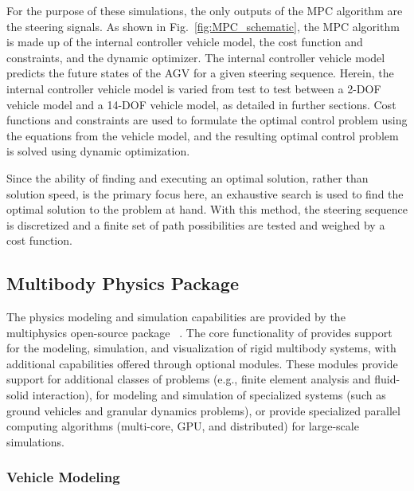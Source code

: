\documentclass[12pt,twocolumn]{article}
\newcommand{\CHRONO}{{\sffamily{{Chrono}}}}
\begin{document}
For the purpose of these simulations, the only outputs of the MPC algorithm are the steering signals. As shown in Fig.~\ref{fig:MPC_schematic}, the MPC algorithm is made up of the internal controller vehicle model, the cost function and constraints, and the dynamic optimizer. The internal controller vehicle model predicts the future states of the AGV for a given steering sequence. Herein, the internal controller vehicle model is varied from test to test between a 2-DOF vehicle model and a 14-DOF vehicle model, as detailed in further sections. Cost functions and constraints are used to formulate the optimal control problem using the equations from the vehicle model, and the resulting optimal control problem is solved using dynamic optimization.

Since the ability of finding and executing an optimal solution, rather than solution speed, is the primary focus here, an exhaustive search is used to find the optimal solution to the problem at hand. With this method, the steering sequence is discretized and a finite set of path possibilities are tested and weighed by a cost function. 


\subsection{{\CHRONO} Multibody Physics Package}\label{ss:Chrono}

The physics modeling and simulation capabilities are provided by the multiphysics open-source package {\CHRONO}~\cite{Chrono2016}. The core functionality of {\CHRONO} provides support for the modeling, simulation, and visualization of rigid multibody systems, with additional capabilities offered through optional modules. These modules provide support for additional classes of problems (e.g., finite element analysis and fluid-solid interaction), for modeling and simulation of specialized systems (such as ground vehicles and granular dynamics problems), or provide specialized parallel computing algorithms (multi-core, GPU, and distributed) for large-scale simulations.


\subsubsection{Vehicle Modeling}\label{sss:Chrono_Vehicle}
	
\end{document}

